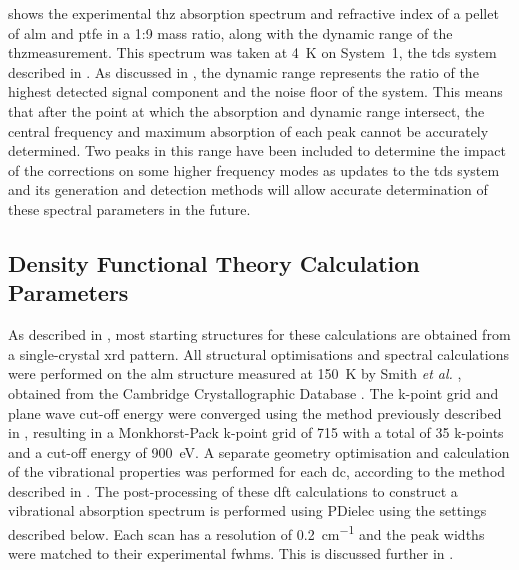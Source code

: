  shows the experimental \acrshort{thz} absorption spectrum and refractive index of a pellet of \acrshort{alm} and \acrshort{ptfe} in a 1:9 mass ratio, along with the dynamic range of the \acrshort{thz}measurement. This spectrum was taken at \SI{4}{K} on  System~1, the \acrshort{tds} system described in . As discussed in , the dynamic range represents the ratio of the highest detected signal component and the noise floor of the system. This means that after the point at which the absorption and dynamic range intersect, the central frequency and maximum absorption of each peak cannot be accurately determined. Two peaks in this range have been included to determine the impact of the corrections on some higher frequency modes as updates to the \acrshort{tds} system and its generation and detection methods will allow accurate determination of these spectral parameters in the future. 

\subsection{Density Functional Theory Calculation Parameters}
As described in , most starting structures for these calculations are obtained from a single\nobreakdash-crystal \acrshort{xrd} pattern. All structural optimisations and spectral calculations were performed on the \acrshort{alm} structure measured at \SI{150}{K} by Smith \textit{et al.} \DIFdelbegin \DIFdel{~}\DIFdelend \cite{Smith2005}, obtained from the Cambridge Crystallographic Database \DIFdelbegin \DIFdel{~}\DIFdelend \cite{Groom2016}. The k\nobreakdash-point grid and plane wave cut-off energy were converged using the method previously described in , resulting in a Monkhorst\nobreakdash-Pack k\nobreakdash-point grid of 715 with a total of 35 k\nobreakdash-points and a cut\nobreakdash-off energy of \SI{900}{eV}. A separate geometry optimisation and calculation of the vibrational properties was performed for each \acrshort{dc}, according to the method described in . The post\nobreakdash-processing of these \acrshort{dft} calculations to construct a vibrational absorption spectrum is performed using PDielec \DIFdelbegin \DIFdel{~}\DIFdelend \cite{Kendrick2016} using the settings described below. Each scan has a resolution of \SI{0.2}{cm^{-1}} and the peak widths were matched to their experimental \acrshort{fwhm}s. This is discussed further in . 

